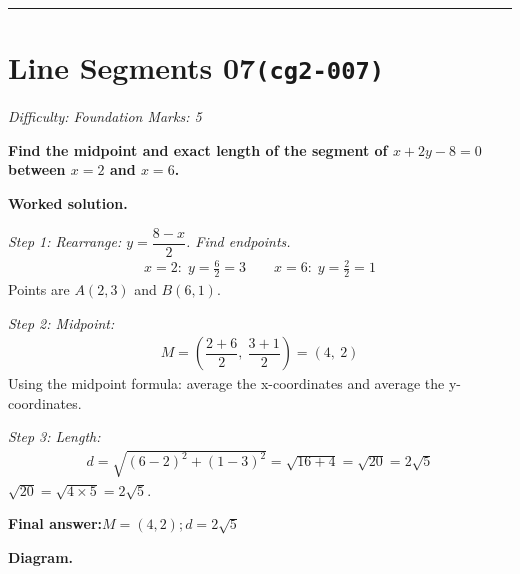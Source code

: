 \documentclass[11pt]{article}
\newcommand{\question}[1]{\par\medskip\noindent\textbf{#1}\par}
\begin{document}
\medskip\hrule

\section*{Line Segments 07\quad\small\texttt{(cg2-007)}}
\textit{Difficulty: Foundation \quad\textbar\quad Marks: 5}

\question{Find the midpoint and exact length of the segment of \( x + 2y - 8 = 0 \) between \( x = 2 \) and \( x = 6 \).}

\textbf{Worked solution.}

\textit{Step 1: Rearrange: \( y = \dfrac{8 - x}{2} \). Find endpoints.}
\[\begin{gathered}
x = 2:\; y = \tfrac{6}{2} = 3 \qquad x = 6:\; y = \tfrac{2}{2} = 1
\end{gathered}\]
Points are \( A(2, 3) \) and \( B(6, 1) \).

\textit{Step 2: Midpoint:}
\[\begin{gathered}
M = \left(\dfrac{2 + 6}{2},\ \dfrac{3 + 1}{2}\right) = (4,\ 2)
\end{gathered}\]
Using the midpoint formula: average the x-coordinates and average the y-coordinates.

\textit{Step 3: Length:}
\[\begin{gathered}
d = \sqrt{(6 - 2)^2 + (1 - 3)^2} = \sqrt{16 + 4} = \sqrt{20} = 2\sqrt{5}
\end{gathered}\]
\(\sqrt{20} = \sqrt{4 \times 5} = 2\sqrt{5}\).

\begin{answerbox}
\textbf{Final answer:}\quad \(\displaystyle M = (4, 2) ;  d = 2\sqrt{5}\)
\end{answerbox}
\textbf{Diagram.}
\end{document}
